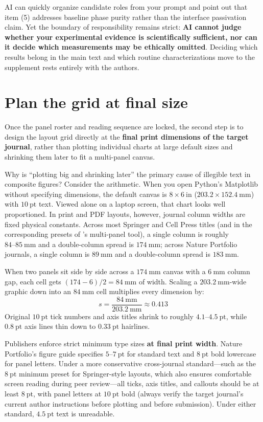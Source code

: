 AI can quickly organize candidate roles from your prompt and point out that item (5) addresses baseline phase purity rather than the interface passivation claim. Yet the boundary of responsibility remains strict: \textbf{AI cannot judge whether your experimental evidence is scientifically sufficient, nor can it decide which measurements may be ethically omitted}. Deciding which results belong in the main text and which routine characterizations move to the supplement rests entirely with the authors.

\section{Plan the grid at final size}

Once the panel roster and reading sequence are locked, the second step is to design the layout grid directly at the \textbf{final print dimensions of the target journal}, rather than plotting individual charts at large default sizes and shrinking them later to fit a multi-panel canvas.

Why is ``plotting big and shrinking later'' the primary cause of illegible text in composite figures? Consider the arithmetic. When you open Python's Matplotlib without specifying dimensions, the default canvas is $8 \times 6\ \text{in}$ ($203.2 \times 152.4\ \text{mm}$) with $10\ \text{pt}$ text. Viewed alone on a laptop screen, that chart looks well proportioned. In print and PDF layouts, however, journal column widths are fixed physical constants. Across most Springer and Cell Press titles (and in the corresponding presets of \scidraw{}'s multi-panel tool), a single column is roughly $84\text{--}85\ \text{mm}$ and a double-column spread is $174\ \text{mm}$; across Nature Portfolio journals, a single column is $89\ \text{mm}$ and a double-column spread is $183\ \text{mm}$.

When two panels sit side by side across a $174\ \text{mm}$ canvas with a $6\ \text{mm}$ column gap, each cell gets $(174 - 6) / 2 = 84\ \text{mm}$ of width. Scaling a $203.2\ \text{mm}$-wide graphic down into an $84\ \text{mm}$ cell multiplies every dimension by:
\[
s = \frac{84\ \text{mm}}{203.2\ \text{mm}} \approx 0.413
\]
Original $10\ \text{pt}$ tick numbers and axis titles shrink to roughly $4.1\text{--}4.5\ \text{pt}$, while $0.8\ \text{pt}$ axis lines thin down to $0.33\ \text{pt}$ hairlines.

Publishers enforce strict minimum type sizes \textbf{at final print width}. Nature Portfolio's figure guide specifies $5\text{--}7\ \text{pt}$ for standard text and $8\ \text{pt}$ bold lowercase for panel letters. Under a more conservative cross-journal standard---such as the $8\ \text{pt}$ minimum preset for Springer-style layouts, which also ensures comfortable screen reading during peer review---all ticks, axis titles, and callouts should be at least $8\ \text{pt}$, with panel letters at $10\ \text{pt}$ bold (always verify the target journal's current author instructions before plotting and before submission). Under either standard, $4.5\ \text{pt}$ text is unreadable.

